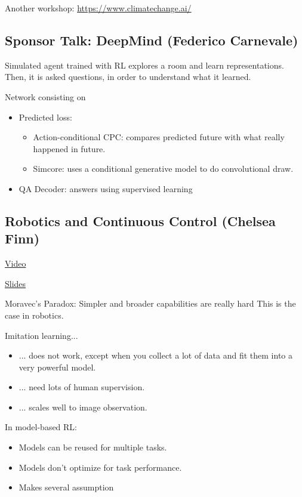 \documentclass[12pt, english]{article}
\begin{document}
Another workshop: \url{https://www.climatechange.ai/}

\subsection{Sponsor Talk: DeepMind (Federico Carnevale)}

Simulated agent trained with RL explores a room and learn representations. Then, it is asked questions, in order to understand what it learned.

Network consisting on

\begin{itemize}
  \item Predicted loss:
  \begin{itemize}
    \item Action-conditional CPC: compares predicted future with what really happened in future.
    \item Simcore: uses a conditional generative model to do convolutional draw.
  \end{itemize}

  \item QA Decoder: answers using supervised learning
\end{itemize}


\subsection{Robotics and Continuous Control (Chelsea Finn)}
\href{http://tv.vera.com.uy/video/55353}{Video}

\href{https://drive.google.com/file/d/13Y2pdqCcd_iTrUEQDbDx3LddE0IkcLqE/view?usp=sharing}{Slides}

Moravec's Paradox: Simpler and broader capabilities are really hard
This is the case in robotics.

Imitation learning...
\begin{itemize}
  \item ... does not work, except when you collect a lot of data and fit them into a very powerful model.
  \item ... need lots of human supervision.
  \item ... scales well to image observation.
\end{itemize}

In model-based RL:
\begin{itemize}
  \item Models can be reused for multiple tasks.
  \item Models don't optimize for task performance.
  \item Makes several assumption
\end{itemize}
\end{document}
